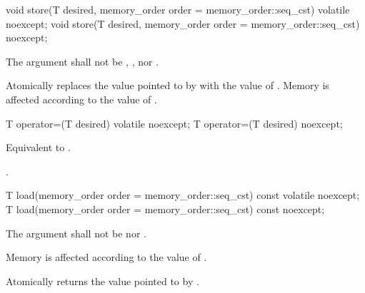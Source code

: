 %
%
%
%
%
%
\begin{itemdecl}
void store(T desired, memory_order order = memory_order::seq_cst) volatile noexcept;
void store(T desired, memory_order order = memory_order::seq_cst) noexcept;
\end{itemdecl}

\begin{itemdescr}
\pnum
\requires The  argument shall not be ,
, nor .

\pnum
\effects Atomically replaces the value pointed to by 
with the value of . Memory is affected according to the value of
.
\end{itemdescr}

%
%
%
%
\begin{itemdecl}
T operator=(T desired) volatile noexcept;
T operator=(T desired) noexcept;
\end{itemdecl}

\begin{itemdescr}
\pnum
\effects Equivalent to .

\pnum
\returns {}.
\end{itemdescr}

%
%
%
%
%
%
\begin{itemdecl}
T load(memory_order order = memory_order::seq_cst) const volatile noexcept;
T load(memory_order order = memory_order::seq_cst) const noexcept;
\end{itemdecl}

\begin{itemdescr}
\pnum
\requires The  argument shall not be  nor .

\pnum
\effects Memory is affected according to the value of .

\pnum
\returns Atomically returns the value pointed to by .
\end{itemdescr}

